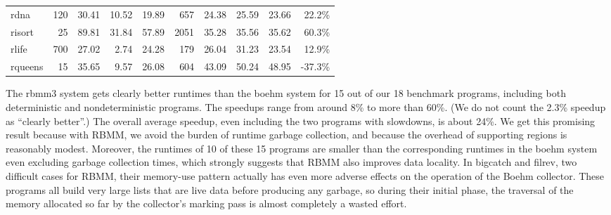 \documentclass{tlp}
\newcommand{\bench}[1]{{#1}}
\begin{document}
\begin{table}[tb]
\begin{tabular}{l|*{9}{r|}}
    \hline
    rdna     &     120 & 30.41 & 10.52 & 19.89 &  657 & 24.38 & 25.59 & 23.66 & 22.2\% \\
    risort   &      25 & 89.81 & 31.84 & 57.89 & 2051 & 35.28 & 35.56 & 35.62 & 60.3\% \\
    rlife    &     700 & 27.02 &  2.74 & 24.28 &  179 & 26.04 & 31.23 & 23.54 & 12.9\% \\
    rqueens  &      15 & 35.65 &  9.57 & 26.08 &  604 & 43.09 & 50.24 & 48.95 &-37.3\% \\
    \hline
    \hline
  \end{tabular}
  \label{table:experiment:runtime}
  \normalsize
\end{table}

The rbmm3 system gets clearly better runtimes than the boehm system
for 15 out of our 18 benchmark programs,
including both deterministic and nondeterministic programs.
The speedups range from around 8\% to more than 60\%.
(We do not count the 2.3\% speedup as ``clearly better''.)
The overall average speedup,
even including the two programs with slowdowns, is about 24\%.
We get this promising result because with RBMM,
we avoid the burden of runtime garbage collection,
and because the overhead of supporting regions is reasonably modest.
Moreover, the runtimes of 10 of these 15 programs
are smaller than the corresponding runtimes in the boehm system
even excluding garbage collection times,
which strongly suggests that RBMM also improves data locality.
In \bench{bigcatch} and \bench{filrev}, two difficult cases for RBMM,
their memory-use pattern actually has even more adverse effects
on the operation of the Boehm collector.
These programs all build very large lists that are live data
before producing any garbage,
so during their initial phase,
the traversal of the memory allocated so far
by the collector's marking pass is almost completely a wasted effort.
\end{document}
